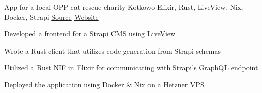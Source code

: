 

\begin{cventries}


  \cventry
    {App for a local OPP cat rescue charity} %
    {Kotkowo} %
    {Elixir, Rust, LiveView, Nix, Docker, Strapi} %
    {\href{https://github.com/kotkowo/kotkowo}{\faGithubSquare\acvHeaderIconSep Source} \quad \href{https://kotkowo.ravensiris.xyz/}{\faCat\acvHeaderIconSep Website}} %
    {
      \begin{cvitems} %
        \item {Developed a frontend for a Strapi CMS using LiveView}
        \item {Wrote a Rust client that utilizes code generation from Strapi schemas}
        \item {Utilized a Rust NIF in Elixir for communicating with Strapi's GraphQL endpoint}
        \item {Deployed the application using Docker \& Nix on a Hetzner VPS}
      \end{cvitems}
    } %


\end{cventries}
